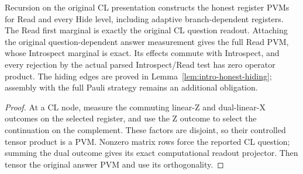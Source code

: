 \begin{lemma}
\label{lem:intro-honest-adaptive}
\leanok
Recursion on the original CL presentation constructs the honest register
PVMs for Read and every Hide level, including adaptive branch-dependent
registers. The Read first marginal is exactly the original CL question
readout. Attaching the original question-dependent answer measurement gives
the full Read PVM, whose Introspect marginal is exact. Its effects commute
with Introspect, and every rejection by the actual parsed Introspect/Read
test has zero operator product. The hiding edges are proved in
Lemma~\ref{lem:intro-honest-hiding}; assembly with the full Pauli strategy
remains an additional obligation.
\end{lemma}
\begin{proof}
\leanok
At a CL node, measure the commuting linear-Z and dual-linear-X outcomes on
the selected register, and use the Z outcome to select the continuation on
the complement. These factors are disjoint, so their controlled tensor
product is a PVM. Nonzero matrix rows force the reported CL question;
summing the dual outcome gives its exact computational readout projector.
Then tensor the original answer PVM and use its orthogonality.
\end{proof}

